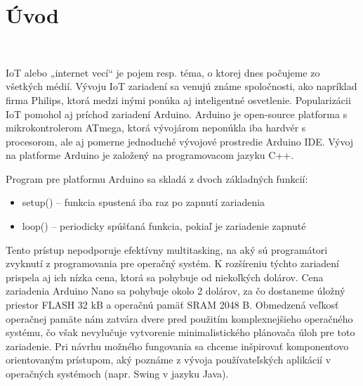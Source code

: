 \newcommand{\format}[1]{{\centering\large\textbf{#1 \\}}}
\newcommand{\formatCase}[1]{{\centering\large\textbf{\MakeUppercase #1 \\}}}

\chapter*{Úvod}

\formatCase\nazov
\vspace{1em}

IoT alebo „internet vecí“ je pojem resp. téma, o ktorej dnes počujeme zo všetkých médií. Vývoju IoT zariadení sa venujú známe spoločnosti, ako napríklad firma Philips, ktorá medzi inými ponúka aj inteligentné osvetlenie. Popularizácii IoT pomohol aj príchod zariadení Arduino. Arduino je open-source platforma s mikrokontrolerom ATmega, ktorá vývojárom neponúkla iba hardvér s procesorom, ale aj pomerne jednoduché vývojové prostredie Arduino IDE. Vývoj na platforme Arduino je založený na programovacom jazyku C++. 

Program pre platformu Arduino sa skladá z dvoch základných funkcií:

\begin{itemize}
\item setup() – funkcia spustená iba raz po zapnutí zariadenia
\item loop() – periodicky spúšťaná funkcia, pokiaľ je zariadenie zapnuté
\end{itemize}

Tento prístup nepodporuje efektívny multitasking, na aký sú programátori zvyknutí z programovania pre operačný systém. K rozšíreniu týchto zariadení prispela aj ich nízka cena, ktorá sa pohybuje od niekoľkých dolárov. Cena zariadenia Arduino Nano sa pohybuje okolo 2 dolárov, za čo dostaneme úložný priestor FLASH 32 kB a operačnú pamäť SRAM 2048 B. Obmedzená veľkosť operačnej pamäte nám zatvára dvere pred použitím komplexnejšieho operačného systému, čo však nevylučuje vytvorenie minimalistického plánovača úloh pre toto zariadenie. Pri návrhu možného fungovania sa chceme inšpirovať komponentovo orientovaným prístupom, aký poznáme z vývoja používateľských aplikácií v operačných systémoch (napr. Swing v jazyku Java).
